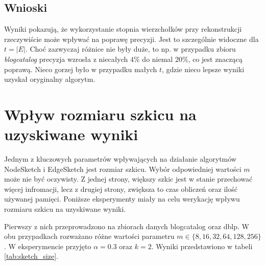     \subsection{Wnioski}
    Wyniki pokazują, że wykorzystanie stopnia wierzchołków przy rekonstrukcji rzeczywiście może wpływać na poprawę precyzji. Jest to szczególnie widoczne dla $t = |E|$. Choć zazwyczaj różnice nie były duże, to np. w przypadku zbioru \emph{blogcatalog} precyzja wzrosła z niecałych $4\%$ do niemal $20\%$, co jest znaczącą poprawą. Nieco gorzej było w przypadku małych $t$, gdzie nieco lepsze wyniki uzyskał oryginalny algorytm.

\section{Wpływ rozmiaru szkicu na uzyskiwane wyniki}
    Jednym z kluczowych parametrów wpływających na działanie algorytmów NodeSketch i EdgeSketch jest rozmiar szkicu. Wybór odpowiedniej wartości $m$ może nie być oczywisty. Z jednej strony, większy szkic jest w stanie przechować więcej infromacji, lecz z drugiej strony, zwiększa to czas obliczeń oraz ilość używanej pamięci. Poniższe eksperymenty miały na celu werykację wpływu rozmiaru szkicu na uzyskiwane wyniki.

    Pierwszy z nich przeprowadzono na zbiorach danych blogcatalog oraz dblp. W obu przypadkach rozważano różne wartości parametru $m \in \{8, 16, 32, 64, 128, 256\}$. W eksperymencie przyjęto $\alpha = 0.3$ oraz $k = 2$. Wyniki przedstawiono w tabeli \ref{tab:sketch_size}.


